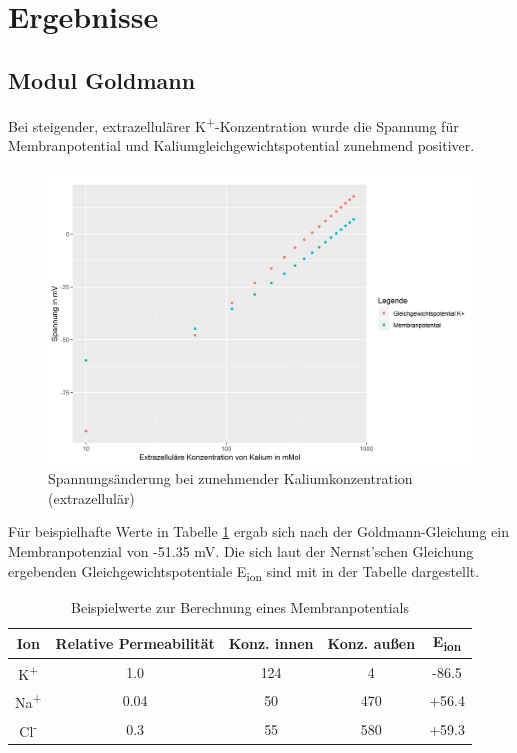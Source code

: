 \documentclass[a4paper]{article}
\begin{document}
\section{Ergebnisse}

\subsection{Modul Goldmann}
Bei steigender, extrazellulärer K\textsuperscript{+}-Konzentration wurde die Spannung für Membranpotential und Kaliumgleichgewichtspotential zunehmend positiver.
\begin{figure}[H]
    \centering
    \includegraphics[width=\textwidth]{images/Aufgabe1_3.png}
    \caption{Spannungsänderung bei zunehmender Kaliumkonzentration (extrazellulär)}
    \label{fig:A1_2}
\end{figure}

\noindent Für beispielhafte Werte in Tabelle \ref{tab:A1_4} ergab sich nach der Goldmann-Gleichung ein Membranpotenzial von -51.35 mV. Die sich laut der Nernst'schen Gleichung ergebenden Gleichgewichtspotentiale E\textsubscript{ion} sind mit in der Tabelle dargestellt.
\begin{table}[H]
    \centering
    \caption{Beispielwerte zur Berechnung eines Membranpotentials}
    \begin{tabular}{|c|c|c|c|c|}
        \hline
        \textbf{Ion} & \textbf{Relative Permeabilität} & \textbf{Konz. innen} & \textbf{Konz. außen} & \textbf{E\textsubscript{ion}}\\
        \hline
        K\textsuperscript{+} & 1.0 & 124 & 4 & -86.5\\
        \hline
        Na\textsuperscript{+} & 0.04 & 50 & 470 & +56.4\\
        \hline
        Cl\textsuperscript{-} & 0.3 & 55 & 580 & +59.3\\
        \hline
    \end{tabular}
    \label{tab:A1_4}
\end{table}
\end{document}
